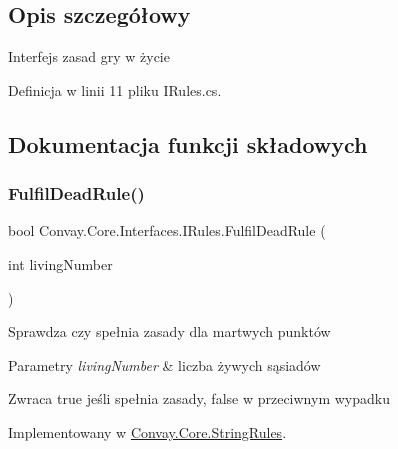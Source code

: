 \subsection{Opis szczegółowy}
Interfejs zasad gry w życie 



Definicja w linii 11 pliku I\+Rules.\+cs.



\subsection{Dokumentacja funkcji składowych}
\hypertarget{interface_convay_1_1_core_1_1_interfaces_1_1_i_rules_a180f2cc36d8f7db4407f679c18cf51b6}{}\label{interface_convay_1_1_core_1_1_interfaces_1_1_i_rules_a180f2cc36d8f7db4407f679c18cf51b6} 
\subsubsection{\texorpdfstring{Fulfil\+Dead\+Rule()}{FulfilDeadRule()}}
{\footnotesize\ttfamily bool Convay.\+Core.\+Interfaces.\+I\+Rules.\+Fulfil\+Dead\+Rule (\begin{DoxyParamCaption}\item[{int}]{living\+Number }\end{DoxyParamCaption})}



Sprawdza czy spełnia zasady dla martwych punktów 


\begin{DoxyParams}{Parametry}
{\em living\+Number} & liczba żywych sąsiadów\\
\hline
\end{DoxyParams}
\begin{DoxyReturn}{Zwraca}
true jeśli spełnia zasady, false w przeciwnym wypadku
\end{DoxyReturn}


Implementowany w \hyperlink{class_convay_1_1_core_1_1_string_rules_ae5cbc291877c0ef6b27302d64e7666ed}{Convay.\+Core.\+String\+Rules}.

\hypertarget{interface_convay_1_1_core_1_1_interfaces_1_1_i_rules_ad184ed56601ab383d06db323a83fa48e}{}\label{interface_convay_1_1_core_1_1_interfaces_1_1_i_rules_ad184ed56601ab383d06db323a83fa48e} 
